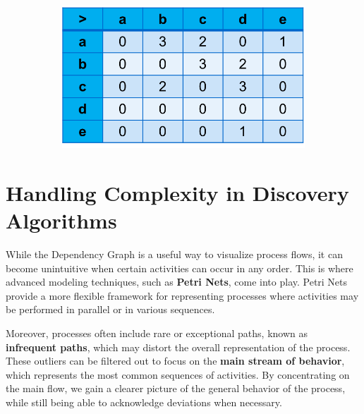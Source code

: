 \begin{figure}[htbp]
\begin{subfigure}{\textwidth}
            \includegraphics[scale=0.8]{capitolo 2/tabella1.png}
        \end{subfigure}
    \end{figure}
    
    \section{Handling Complexity in Discovery Algorithms}
    
    While the Dependency Graph is a useful way to visualize process flows, it can become unintuitive when certain activities can occur in any order. This is where advanced modeling techniques, such as \textbf{Petri Nets}, come into play. Petri Nets provide a more flexible framework for representing processes where activities may be performed in parallel or in various sequences.
    
    Moreover, processes often include rare or exceptional paths, known as \textbf{infrequent paths}, which may distort the overall representation of the process. These outliers can be filtered out to focus on the \textbf{main stream of behavior}, which represents the most common sequences of activities. By concentrating on the main flow, we gain a clearer picture of the general behavior of the process, while still being able to acknowledge deviations when necessary.
